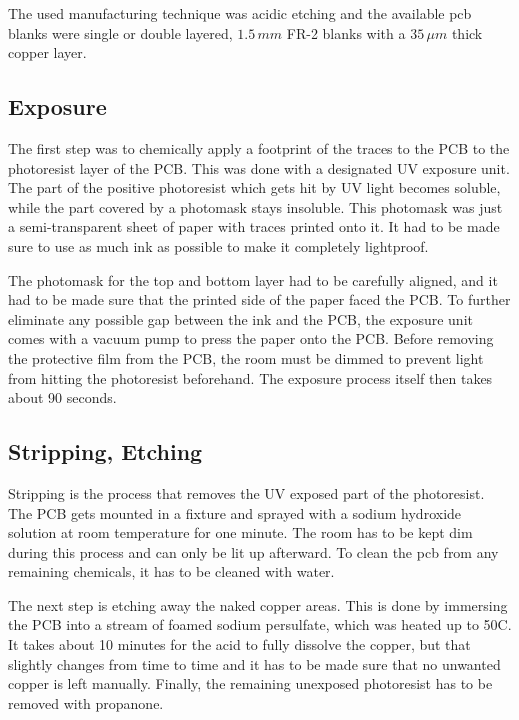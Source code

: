 The used manufacturing technique was acidic etching and the available \gls{pcb} blanks were single or double layered, \(1.5\,mm\) FR-2 blanks with a \(35\,\mu m\) thick copper layer.

\subsection{Exposure}

The first step was to chemically apply a footprint of the traces to the PCB to the photoresist layer of the PCB. This was done with a designated UV exposure unit. The part of the positive photoresist which gets hit by UV light becomes soluble, while the part covered by a photomask stays insoluble. This photomask was just a semi-transparent sheet of paper with traces printed onto it. It had to be made sure to use as much ink as possible to make it completely lightproof.

The photomask for the top and bottom layer had to be carefully aligned, and it had to be made sure that the printed side of the paper faced the PCB. To further eliminate any possible gap between the ink and the PCB, the exposure unit comes with a vacuum pump to press the paper onto the PCB. Before removing the protective film from the PCB, the room must be dimmed to prevent light from hitting the photoresist beforehand. The exposure process itself then takes about 90 seconds.

\subsection{Stripping, Etching}

Stripping is the process that removes the UV exposed part of the photoresist. The PCB gets mounted in a fixture and sprayed with a sodium hydroxide solution at room temperature for one minute. The room has to be kept dim during this process and can only be lit up afterward. To clean the \gls{pcb} from any remaining chemicals, it has to be cleaned with water.

The next step is etching away the naked copper areas. This is done by immersing the PCB into a stream of foamed sodium persulfate, which was heated up to 50\textdegree C. It takes about 10 minutes for the acid to fully dissolve the copper, but that slightly changes from time to time and it has to be made sure that no unwanted copper is left manually. Finally, the remaining unexposed photoresist has to be removed with propanone.

